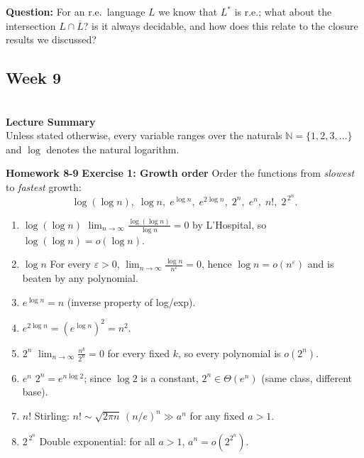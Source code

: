 \documentclass{article}
\theoremstyle{theorem}
\theoremstyle{definition}
\theoremstyle{remark}
\begin{document}
\textbf{Question: } For an r.e.\ language \(L\) we know that \(L^{*}\) is r.e.; what about the intersection  
        \(L \cap \overline{L}\)? is it always decidable, and how does this relate to the closure results we discussed?


\subsection{\textbf{Week 9}}\\
\textbf{Lecture Summary}
\\Unless stated otherwise, every variable ranges over the naturals $\mathbb N=\{1,2,3,\dots\}$ and $\log$ denotes the natural logarithm.

\textbf{Homework 8-9}
\textbf{Exercise 1: Growth order}
Order the functions from \emph{slowest} to \emph{fastest} growth:
\[
\log(\log n),\;
\log n,\;
e^{\log n},\;
e^{2\log n},\;
2^{n},\;
e^{n},\;
n!,\;
2^{\,2^{n}}.
\]

\begin{enumerate}
  \item $\log(\log n)$ \quad 
        $\displaystyle\lim_{n\to\infty}\frac{\log(\log n)}{\log n}=0$  
        by L’Hospital, so $\log(\log n)=o(\log n)$.

  \item $\log n$ \quad 
        For every $\varepsilon>0$, $\displaystyle\lim_{n\to\infty}\frac{\log n}{n^\varepsilon}=0$,  
        hence $\log n=o(n^\varepsilon)$ and is beaten by any polynomial.        

  \item $e^{\log n}=n$ \quad (inverse property of log/exp).

  \item $e^{2\log n}=(e^{\log n})^{2}=n^{2}$.

  \item $2^{n}$ \quad 
        $\displaystyle\lim_{n\to\infty}\frac{n^{k}}{2^{n}}=0$ for every fixed $k$,  
        so every polynomial is $o(2^{n})$.

  \item $e^{n}$ \quad  
        $2^{n}=e^{n\log 2}$; since $\log 2$ is a constant,  
        $2^{n}\in\Theta(e^{n})$ (same class, different base).

  \item $n!$ \quad  
        Stirling: $n!\sim\sqrt{2\pi n}\,(n/e)^{n}\gg a^{n}$ for any fixed $a>1$.

  \item $2^{\,2^{n}}$ \quad  
        Double exponential: for all $a>1$, $a^{n}=o(2^{2^{n}})$.
\end{enumerate}
\end{document}
